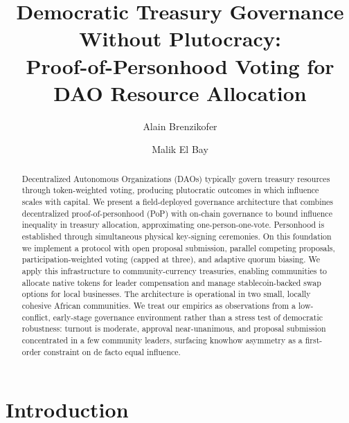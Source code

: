 \documentclass{svproc}
\begin{document}
\mainmatter

\title{Democratic Treasury Governance Without Plutocracy:\\
Proof-of-Personhood Voting for DAO Resource Allocation}


\author{Alain Brenzikofer \and Malik El Bay}

\maketitle

\begin{abstract}
Decentralized Autonomous Organizations (DAOs) typically govern treasury resources through token-weighted voting, producing plutocratic outcomes in which influence scales with capital. We present a field-deployed governance architecture that combines decentralized proof-of-personhood (PoP) with on-chain governance to bound influence inequality in treasury allocation, approximating one-person-one-vote. Personhood is established through simultaneous physical key-signing ceremonies. On this foundation we implement a protocol with open proposal submission, parallel competing proposals, participation-weighted voting (capped at three), and adaptive quorum biasing. We apply this infrastructure to community-currency treasuries, enabling communities to allocate native tokens for leader compensation and manage stablecoin-backed swap options for local businesses. The architecture is operational in two small, locally cohesive African communities. We treat our empirics as observations from a low-conflict, early-stage governance environment rather than a stress test of democratic robustness: turnout is moderate, approval near-unanimous, and proposal submission concentrated in a few community leaders, surfacing knowhow asymmetry as a first-order constraint on de facto equal influence.
%
\end{abstract}

\section{Introduction}
\label{sec:intro}
\end{document}
